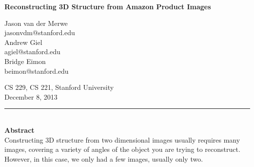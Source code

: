 \documentclass[12pt]{article}
\begin{document}
\begin{center}

{\Large \textbf{Reconstructing 3D Structure from Amazon Product Images}}

\begin{multicols}{3}
Jason van der Merwe\\
jasonvdm@stanford.edu\\
\columnbreak
Andrew Giel\\
agiel@stanford.edu\\
\columnbreak
Bridge Eimon\\
beimon@stanford.edu\\
\end{multicols}
CS 229, CS 221, Stanford University\\
December 8, 2013\\
\end{center}
\noindent\rule{16.5cm}{0.4pt}\\
{\large \textbf{Abstract}}\\
Constructing 3D structure from two dimensional images usually requires many images, covering a variety of angles of the object you are trying to reconstruct. However, in this case, we only had a few images, usually only two.
\end{document}
